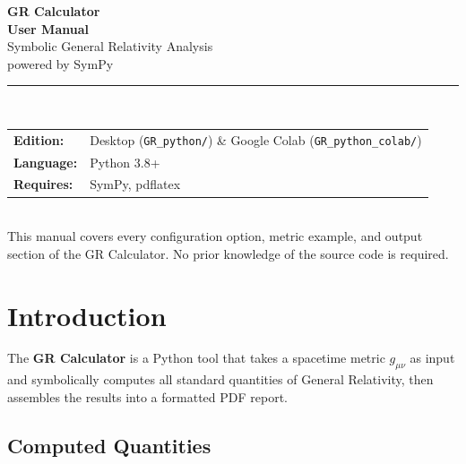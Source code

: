 \documentclass[11pt,a4paper]{article}
\newcommand{\code}[1]{\texttt{\small#1}}
\begin{document}
\begin{titlepage}
  \centering
  \vspace*{3cm}
  {\Huge\bfseries\color{headcol} GR Calculator}\\[0.6em]
  {\LARGE\bfseries User Manual}\\[1.5em]
  {\large Symbolic General Relativity Analysis\\powered by SymPy}\\[2em]
  \rule{0.4\textwidth}{1pt}\\[2em]
  {\large
    \begin{tabular}{ll}
      \textbf{Edition:}    & Desktop (\code{GR\_python/}) \&
                             Google Colab (\code{GR\_python\_colab/})\\[4pt]
      \textbf{Language:}   & Python 3.8+\\[4pt]
      \textbf{Requires:}   & SymPy, pdflatex\\[4pt]
    \end{tabular}
  }\\[3em]
  \vfill
  {\normalsize\color{gray}
    This manual covers every configuration option, metric example, and output
    section of the GR Calculator.  No prior knowledge of the source code is
    required.}
\end{titlepage}

\tableofcontents
\newpage

\section{Introduction}
\label{sec:intro}

The \textbf{GR Calculator} is a Python tool that takes a spacetime metric
$g_{\mu\nu}$ as input and symbolically computes all standard quantities of
General Relativity, then assembles the results into a formatted PDF report.

\subsection*{Computed Quantities}
\end{document}
